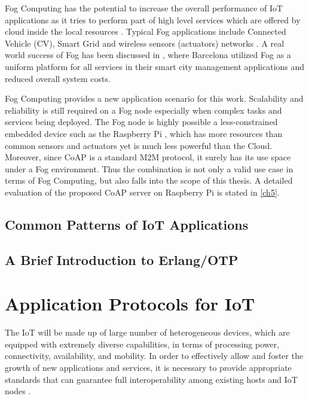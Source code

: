 Fog Computing has the potential to increase the overall performance of IoT applications as it tries to perform part of high level services which are offered by cloud inside the local resources \cite{7123563}. Typical Fog applications include Connected Vehicle (CV), Smart Grid and wireless sensors (actuators) networks \cite{Bonomi:2012:FCR:2342509.2342513}. A real world success of Fog has been discussed in \cite{7498684}, where Barcelona utilized Fog as a uniform platform for all services in their smart city management applications and reduced overall system costs.

Fog Computing provides a new application scenario for this work. Scalability and reliability is still required on a Fog node especially when complex tasks and services being deployed. The Fog node is highly possible a less-constrained embedded device such as the Raspberry Pi \cite{raspberry_pi}, which has more resources than common sensors and actuators yet is much less powerful than the Cloud. Moreover,  since CoAP is a standard M2M protocol, it surely has its use space under a Fog environment. Thus the combination is not only a valid use case in terms of Fog Computing, but also falls into the scope of this thesis. A detailed evaluation of the proposed CoAP server on Raspberry Pi is stated in \autoref{ch5}.

\subsection{Common Patterns of IoT Applications}

\subsection{A Brief Introduction to Erlang/OTP}














\section{Application Protocols for IoT} \label{IoT_protocols}

The IoT will be made up of large number of heterogeneous devices, which are equipped with extremely diverse capabilities, in terms of processing power, connectivity, availability, and mobility. In order to effectively allow and foster the growth of new applications and services, it is necessary to provide appropriate standards that can guarantee full interoperability among existing hosts and IoT nodes \cite{cirani2015mjcoap}. 


